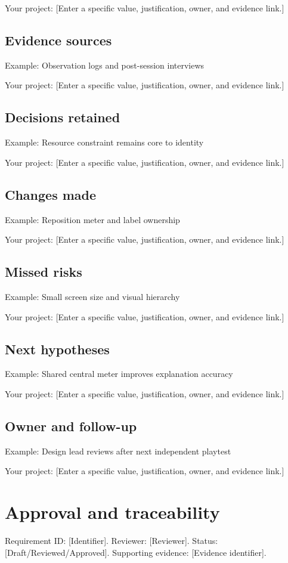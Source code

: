 \documentclass[11pt]{article}
\begin{document}
Your project: [Enter a specific value, justification, owner, and evidence link.]


\subsection{Evidence sources}
Example: Observation logs and post-session interviews

Your project: [Enter a specific value, justification, owner, and evidence link.]


\subsection{Decisions retained}
Example: Resource constraint remains core to identity

Your project: [Enter a specific value, justification, owner, and evidence link.]


\subsection{Changes made}
Example: Reposition meter and label ownership

Your project: [Enter a specific value, justification, owner, and evidence link.]


\subsection{Missed risks}
Example: Small screen size and visual hierarchy

Your project: [Enter a specific value, justification, owner, and evidence link.]


\subsection{Next hypotheses}
Example: Shared central meter improves explanation accuracy

Your project: [Enter a specific value, justification, owner, and evidence link.]


\subsection{Owner and follow-up}
Example: Design lead reviews after next independent playtest

Your project: [Enter a specific value, justification, owner, and evidence link.]


\section{Approval and traceability}
Requirement ID: [Identifier]. Reviewer: [Reviewer]. Status: [Draft/Reviewed/Approved]. Supporting evidence: [Evidence identifier].
\end{document}
